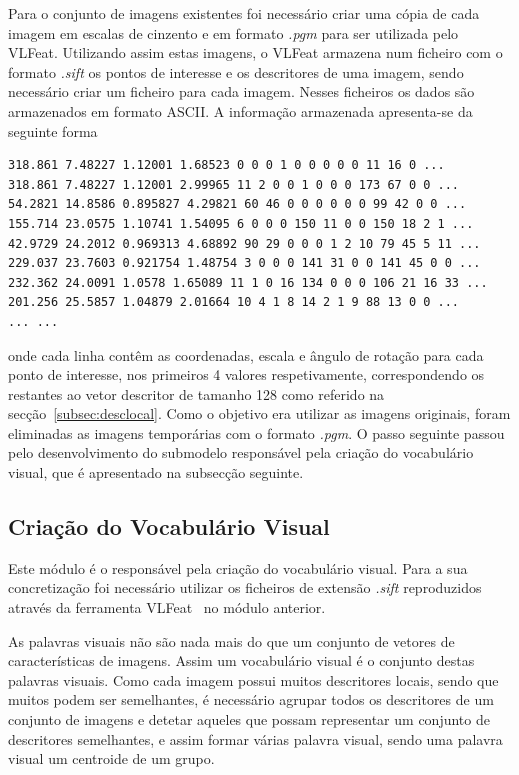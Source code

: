 Para o conjunto de imagens existentes foi necessário criar uma cópia de cada imagem em escalas de cinzento e em formato \textit{.pgm} para ser utilizada pelo VLFeat. Utilizando assim estas imagens, o VLFeat armazena num ficheiro com o formato \textit{.sift} os pontos de interesse e os descritores de uma imagem, sendo necessário criar um ficheiro para cada imagem. Nesses ficheiros os dados são armazenados em formato ASCII. 
A informação armazenada apresenta-se da seguinte forma 

\begin{lstlisting}
318.861 7.48227 1.12001 1.68523 0 0 0 1 0 0 0 0 0 11 16 0 ...
318.861 7.48227 1.12001 2.99965 11 2 0 0 1 0 0 0 173 67 0 0 ...
54.2821 14.8586 0.895827 4.29821 60 46 0 0 0 0 0 0 99 42 0 0 ...
155.714 23.0575 1.10741 1.54095 6 0 0 0 150 11 0 0 150 18 2 1 ...
42.9729 24.2012 0.969313 4.68892 90 29 0 0 0 1 2 10 79 45 5 11 ...
229.037 23.7603 0.921754 1.48754 3 0 0 0 141 31 0 0 141 45 0 0 ...
232.362 24.0091 1.0578 1.65089 11 1 0 16 134 0 0 0 106 21 16 33 ...
201.256 25.5857 1.04879 2.01664 10 4 1 8 14 2 1 9 88 13 0 0 ...
... ...
\end{lstlisting}

onde cada linha contêm as coordenadas, escala e ângulo de rotação para cada ponto de interesse, nos primeiros 4 valores respetivamente, correspondendo os restantes ao vetor descritor de tamanho 128 como referido na secção~\ref{subsec:desclocal}. Como o objetivo era utilizar as imagens originais, foram eliminadas as imagens temporárias com o formato \textit{.pgm}. O passo seguinte passou pelo desenvolvimento do submodelo responsável pela criação do vocabulário visual, que é apresentado na subsecção seguinte.

\subsection{Criação do Vocabulário Visual}

Este módulo é o responsável pela criação do vocabulário visual. Para a sua concretização foi necessário utilizar os ficheiros de extensão \textit{.sift} reproduzidos através da ferramenta VLFeat~\cite{vedaldi08vlfeat} no módulo anterior. 

As palavras visuais não são nada mais do que um conjunto de vetores de características de imagens. Assim um vocabulário visual é o conjunto destas palavras visuais. Como cada imagem possui muitos descritores locais, sendo que muitos podem ser semelhantes, é necessário agrupar todos os descritores de um conjunto de imagens e detetar aqueles que possam representar um conjunto de descritores semelhantes, e assim formar várias palavra visual, sendo uma palavra visual um centroide de um grupo.

